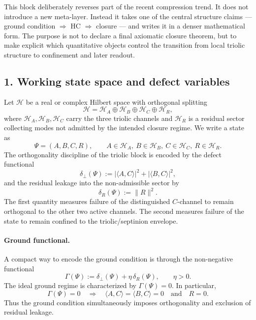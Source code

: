 \documentclass[12pt,a4paper]{article}
\begin{document}
This block deliberately reverses part of the recent compression trend. It does
not introduce a new meta-layer. Instead it takes one of the central structure
claims --- ground condition $\Rightarrow$ HC $\Rightarrow$ closure --- and writes it
in a denser mathematical form. The purpose is not to declare a final axiomatic
closure theorem, but to make explicit which quantitative objects control the
transition from local triolic structure to confinement and later readout.

\subsection*{1. Working state space and defect variables}
Let $\mathcal H$ be a real or complex Hilbert space with orthogonal splitting
\[
\mathcal H = \mathcal H_A \oplus \mathcal H_B \oplus \mathcal H_C \oplus \mathcal H_R,
\]
where $\mathcal H_A,\mathcal H_B,\mathcal H_C$ carry the three triolic channels and
$\mathcal H_R$ is a residual sector collecting modes not admitted by the intended
closure regime. We write a state as
\[
\Psi = (A,B,C,R), \qquad A\in\mathcal H_A,\ B\in\mathcal H_B,\ C\in\mathcal H_C,
\ R\in\mathcal H_R.
\]
The orthogonality discipline of the triolic block is encoded by the defect
functional
\[
\delta_{\perp}(\Psi)
:= |\langle A,C\rangle|^2 + |\langle B,C\rangle|^2,
\]
and the residual leakage into the non-admissible sector by
\[
\delta_R(\Psi) := \|R\|^2.
\]
The first quantity measures failure of the distinguished $C$-channel to remain
orthogonal to the other two active channels. The second measures failure of the
state to remain confined to the triolic/septinion envelope.

\paragraph{Ground functional.}
A compact way to encode the ground condition is through the non-negative
functional
\[
\Gamma(\Psi) := \delta_{\perp}(\Psi) + \eta\,\delta_R(\Psi), \qquad \eta>0.
\]
The ideal ground regime is characterized by $\Gamma(\Psi)=0$. In particular,
\[
\Gamma(\Psi)=0 \quad \Longrightarrow \quad \langle A,C\rangle=\langle B,C\rangle=0
\quad\text{and}\quad R=0.
\]
Thus the ground condition simultaneously imposes orthogonality and exclusion of
residual leakage.
\end{document}
